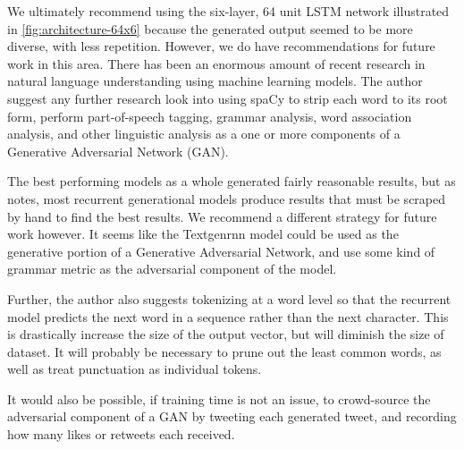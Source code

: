\documentclass[letterpaper]{article}
\begin{document}
    We ultimately recommend using the six-layer, 64 unit LSTM network illustrated in \autoref{fig:architecture-64x6} because the generated output seemed to be more diverse, with less repetition. However, we do have recommendations for future work in this area. There has been an enormous amount of recent research in natural language understanding using machine learning models. The author suggest any further research look into using spaCy \citep{spacy2} to strip each word to its root form, perform part-of-speech tagging, grammar analysis, word association analysis, and other linguistic analysis as a one or more components of a Generative Adversarial Network (GAN).

    The best performing models as a whole generated fairly reasonable results, but as \citet{karpathy_2015} notes, most recurrent generational models produce results that must be scraped by hand to find the best results. We recommend a different strategy for future work however. It seems like the Textgenrnn model could be used as the generative portion of a Generative Adversarial Network, and use some kind of grammar metric as the adversarial component of the model.

    Further, the author also suggests tokenizing at a word level so that the recurrent model predicts the next word in a sequence rather than the next character. This is drastically increase the size of the output vector, but will diminish the size of dataset. It will probably be necessary to prune out the least common words, as well as treat punctuation as individual tokens.

    It would also be possible, if training time is not an issue, to crowd-source the adversarial component of a GAN by tweeting each generated tweet, and recording how many likes or retweets each received.



\end{document}
